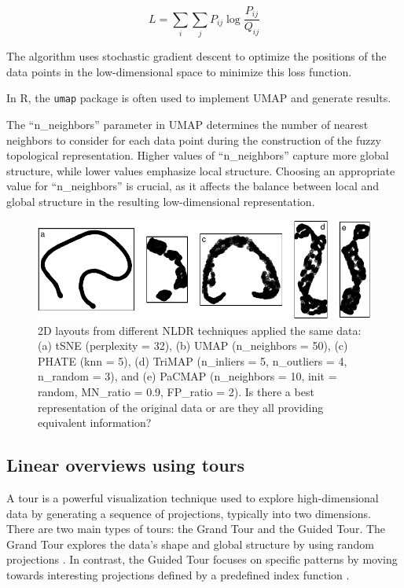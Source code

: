 \documentclass[
  12pt]{article}
\begin{document}
\[
L = \sum_{i} \sum_{j} P_{ij} \log \frac{P_{ij}}{Q_{ij}}
\]

The algorithm uses stochastic gradient descent to optimize the positions
of the data points in the low-dimensional space to minimize this loss
function.

In R, the \texttt{umap} package is often used to implement UMAP and
generate results.

The ``n\_neighbors'' parameter in UMAP determines the number of nearest
neighbors to consider for each data point during the construction of the
fuzzy topological representation. Higher values of ``n\_neighbors''
capture more global structure, while lower values emphasize local
structure. Choosing an appropriate value for ``n\_neighbors'' is
crucial, as it affects the balance between local and global structure in
the resulting low-dimensional representation.

\begin{figure}

{\centering \includegraphics[width=1\textwidth,height=\textheight]{paper_files/figure-pdf/fig-nldervis-1.pdf}

}

\caption{\label{fig-nldervis}2D layouts from different NLDR techniques
applied the same data: (a) tSNE (perplexity = 32), (b) UMAP
(n\_neighbors = 50), (c) PHATE (knn = 5), (d) TriMAP (n\_inliers = 5,
n\_outliers = 4, n\_random = 3), and (e) PaCMAP (n\_neighbors = 10, init
= random, MN\_ratio = 0.9, FP\_ratio = 2). Is there a best
representation of the original data or are they all providing equivalent
information?}

\end{figure}

\hypertarget{linear-overviews-using-tours}{%
\subsection{Linear overviews using
tours}\label{linear-overviews-using-tours}}

A tour is a powerful visualization technique used to explore
high-dimensional data by generating a sequence of projections, typically
into two dimensions. There are two main types of tours: the Grand Tour
and the Guided Tour. The Grand Tour explores the data's shape and global
structure by using random projections \citep{Asimov1985}. In contrast,
the Guided Tour focuses on specific patterns by moving towards
interesting projections defined by a predefined index function
\citep{article29}.
\end{document}

